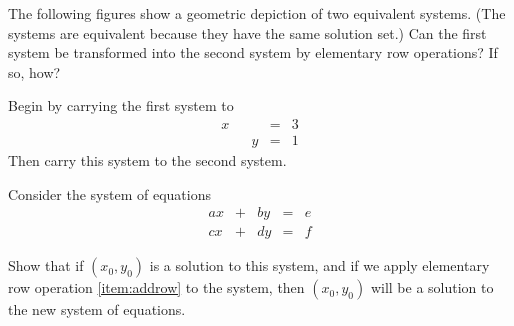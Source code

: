 \documentclass{ximera}
\begin{document}
\begin{problem}\label{prob:reverserowopsgeometry}
The following figures show a geometric depiction of two equivalent systems.  (The systems are equivalent because they have the same solution set.)  Can the first system be transformed into the second system by elementary row operations?  If so, how?

 \begin{center}
\quad\quad
{}
\end{center}

\begin{hint}
Begin by carrying the first system to 
$$\begin{array}{ccccc}
      x & &&= &3\\
      & &y&=&1      
    \end{array}$$
    Then carry this system to the second system.
\end{hint}

\end{problem}

\begin{problem}\label{prob:equivsystems1}
Consider the system of equations
$$\begin{array}{ccccc}
      ax &+ &by&= &e\\
      cx&+ &dy&=&f      
    \end{array}$$

Show that  if  $(x_0,y_0)$ is a solution to this system, and if we apply elementary row operation \ref{item:addrow} to the system, then $(x_0,y_0)$ will be a solution to the new system of equations.
\end{problem}
\end{document}
